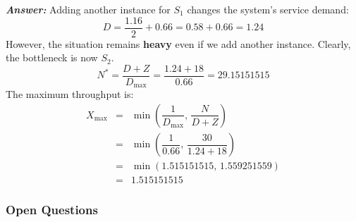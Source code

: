 \begin{enumerate}
    \textcolor{Green3}{\textbf{\emph{Answer:}}} Adding another instance for $S_1$ changes the system's service demand:
    \begin{equation*}
        D = \dfrac{1.16}{2} + 0.66 = 0.58 + 0.66 = 1.24
    \end{equation*}
    However, the situation remains \textbf{heavy} even if we add another instance. Clearly, the bottleneck is now $S_2$.
    \begin{equation*}
        N^{*} = \dfrac{D + Z}{D_{\max}} = \dfrac{1.24 + 18}{0.66} = 29.15151515
    \end{equation*}
    The maximum throughput is:
    \begin{equation*}
        \begin{array}{rcl}
            X_{\max} &=& \min\left(\dfrac{1}{D_{\max}},\, \dfrac{N}{D+Z}\right) \\ [1.3em]
            &=& \min\left(\dfrac{1}{0.66},\, \dfrac{30}{1.24 + 18}\right) \\ [1.3em]
            &=& \min\left(1.515151515,\, 1.559251559\right) \\ [.5em]
            &=& \mathbf{1.51}5151515
        \end{array}
    \end{equation*}
\end{enumerate}


\subsubsection*{Open Questions}

